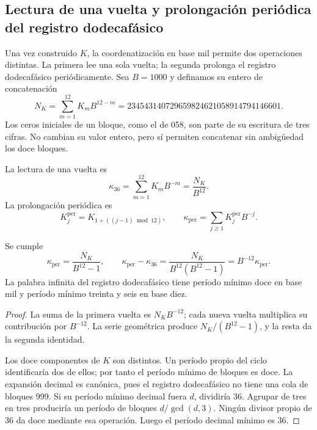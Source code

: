 \subsection{Lectura de una vuelta y prolongación periódica del registro dodecafásico}
\label{subsec:k-kappas}

Una vez construido \(K\), la coordenatización en base mil permite dos operaciones
distintas. La primera lee una sola vuelta; la segunda prolonga el registro dodecafásico
periódicamente. Sea \(B=1000\) y definamos su entero de concatenación
\begin{equation}
 N_K=\sum_{m=1}^{12}K_mB^{12-m}
 =234543140729659824621058914794146601.
 \label{eq:k-numerador}
\end{equation}
Los ceros iniciales de un bloque, como el de 058, son parte de su escritura
de tres cifras. No cambian su valor entero, pero sí permiten concatenar
sin ambigüedad los doce bloques.

\begin{definition}
\label{def:k-kappas}
La lectura de una vuelta es
\[
 \kappa_{36}=\sum_{m=1}^{12}K_mB^{-m}=\frac{N_K}{B^{12}}.
\]
La prolongación periódica es
\[
 K_j^{\mathrm{per}}=K_{1+((j-1)\bmod12)},\qquad
 \kappa_{\mathrm{per}}=\sum_{j\geq1}K_j^{\mathrm{per}}B^{-j}.
\]
\end{definition}

\begin{proposition}
\label{prop:k-periodo}
Se cumple
\begin{equation}
 \kappa_{\mathrm{per}}=\frac{N_K}{B^{12}-1},\qquad
 \kappa_{\mathrm{per}}-\kappa_{36}
 =\frac{N_K}{B^{12}(B^{12}-1)}
 =B^{-12}\kappa_{\mathrm{per}}.
 \label{eq:k-diferencia-kappas}
\end{equation}
La palabra infinita del registro dodecafásico tiene período mínimo doce en base mil y
período mínimo treinta y seis en base diez.
\end{proposition}

\begin{proof}
La suma de la primera vuelta es \(N_KB^{-12}\); cada nueva vuelta
multiplica su contribución por \(B^{-12}\). La serie geométrica produce
\(N_K/(B^{12}-1)\), y la resta da la segunda identidad.

Los doce componentes de \(K\) son distintos. Un período propio del ciclo
identificaría dos de ellos; por tanto el período mínimo de bloques es
doce. La expansión decimal es canónica, pues el registro dodecafásico no tiene una cola
de bloques 999. Si su período mínimo decimal fuera \(d\), dividiría
36. Agrupar de tres en tres produciría un período de bloques
\(d/\gcd(d,3)\). Ningún divisor propio de 36 da doce mediante esa
operación. Luego el período decimal mínimo es 36.
\end{proof}


